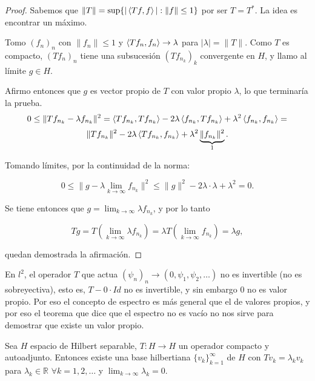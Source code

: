\begin{proof}
  Sabemos que $\|T\|=\sup \{|\left\langle Tf,f\right\rangle|:\|f\|\le 1\}$ por ser $T=T^*$. La
  idea es encontrar un máximo.

  Tomo $(f_n)_n$ con $\|f_n\|\le 1$ y $\left\langle Tf_n,f_n\right\rangle\to \lambda$ para
  $|\lambda|=\|T\|$. Como $T$ es compacto, $(Tf_n)_n$ tiene una subsucesión
  $(Tf_{n_k})_k$ convergente en $H$, y llamo al límite $g\in H$.

  Afirmo entonces que $g$ es vector propio de $T$ con valor propio $\lambda$, lo
  que terminaría la prueba.
  \[
  0\le \|Tf_{n_k}-\lambda f_{n_k}\|^2 =
  \left\langle Tf_{n_k},Tf_{n_k}\right\rangle-2\lambda\left\langle f_{n_k},Tf_{n_k}\right\rangle+\lambda^2
  \left\langle f_{n_k},f_{n_k}\right\rangle=
  \] 
  \[
  \|Tf_{n_k}\|^2-2\lambda\left\langle Tf_{n_k},f_{n_k}\right\rangle + \lambda^2
  \underbrace{\|f_{n_k}\|^2}_{1}
  .\] 

  Tomando límites, por la continuidad de la norma:

  \[
  0\le \|g-\lambda \lim_{k \to \infty} f_{n_k}\|^2 \le 
  \|g\|^2-2\lambda\cdot \lambda + \lambda^2=0
  .\] 
  
  Se tiene entonces que $g=\lim_{k \to \infty} \lambda f_{n_k}$, y por lo tanto

  \[
  Tg = T(\lim_{k \to \infty} \lambda f_{n_k})=\lambda T(\lim_{k \to \infty}
  f_{n_k})=\lambda g
  ,\] 

  quedan demostrada la afirmación.

\end{proof}

\begin{remark}
  En $l^2$, el operador $T$ que actua $(\psi_n)_n\to (0,\psi_1,\psi_2,\ldots)$
  no es invertible (no es sobreyectiva), esto es, $T-0\cdot Id$ no es
  invertible, y sin embargo $0$ no es valor propio. Por eso el concepto de
  espectro es más general que el de valores propios, y por eso el teorema que
  dice que el espectro no es vacío no nos sirve para demostrar que existe un
  valor propio.
\end{remark}

\begin{theorem}
  \label{th:hilbert-schmidt}
  Sea $H$ espacio de Hilbert separable, $T:H\to H$ un operador compacto y
  autoadjunto. Entonces existe una base hilbertiana $\{v_k\}_{k=1}^\infty$ de $H$ 
  con $Tv_k=\lambda_k v_k$ para $\lambda_k\in \mathbb{R}$ $\forall k=1,2,\ldots$ y
  $\lim_{k \to \infty} \lambda_k=0$.
\end{theorem}

